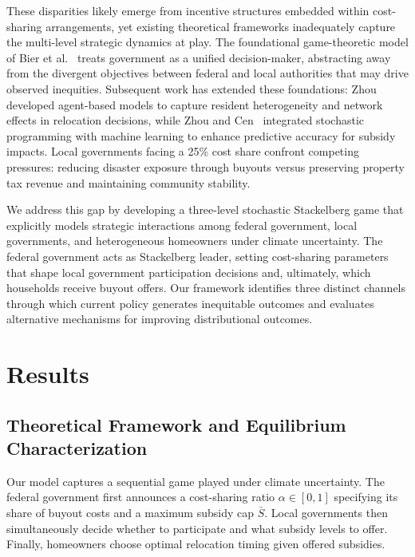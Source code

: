 \documentclass[11pt,letterpaper]{article}
\theoremstyle{definition}
\begin{document}
These disparities likely emerge from incentive structures embedded within cost-sharing arrangements, yet existing theoretical frameworks inadequately capture the multi-level strategic dynamics at play. The foundational game-theoretic model of Bier et al.~\cite{bier2019game} treats government as a unified decision-maker, abstracting away from the divergent objectives between federal and local authorities that may drive observed inequities. Subsequent work has extended these foundations: Zhou~\cite{zhou2022predisaster} developed agent-based models to capture resident heterogeneity and network effects in relocation decisions, while Zhou and Cen~\cite{zhou2025stochastic} integrated stochastic programming with machine learning to enhance predictive accuracy for subsidy impacts. Local governments facing a 25\% cost share confront competing pressures: reducing disaster exposure through buyouts versus preserving property tax revenue and maintaining community stability.

We address this gap by developing a three-level stochastic Stackelberg game that explicitly models strategic interactions among federal government, local governments, and heterogeneous homeowners under climate uncertainty. The federal government acts as Stackelberg leader, setting cost-sharing parameters that shape local government participation decisions and, ultimately, which households receive buyout offers. Our framework identifies three distinct channels through which current policy generates inequitable outcomes and evaluates alternative mechanisms for improving distributional outcomes.

\section{Results}

\subsection{Theoretical Framework and Equilibrium Characterization}

Our model captures a sequential game played under climate uncertainty. The federal government first announces a cost-sharing ratio $\alpha \in [0,1]$ specifying its share of buyout costs and a maximum subsidy cap $\bar{S}$. Local governments then simultaneously decide whether to participate and what subsidy levels to offer. Finally, homeowners choose optimal relocation timing given offered subsidies.
\end{document}
